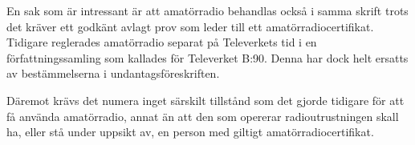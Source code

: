 En sak som är intressant är att amatörradio behandlas också i samma
skrift trots det kräver ett godkänt avlagt prov som leder till ett
amatörradiocertifikat. Tidigare reglerades amatörradio separat på
Televerkets tid i en författningssamling som kallades för Televerket
B:90. Denna har dock helt ersatts av bestämmelserna i
undantagsföreskriften.

Däremot krävs det numera inget särskilt tillstånd som det gjorde
tidigare för att få använda amatörradio, annat än att den som opererar
radioutrustningen skall ha, eller stå under uppsikt av, en person med
giltigt amatörradiocertifikat.

